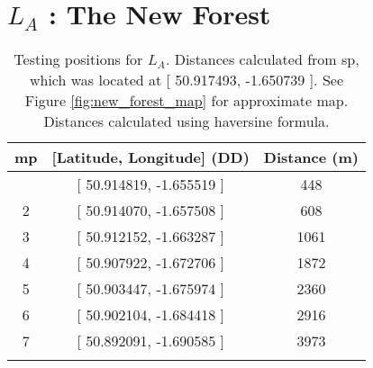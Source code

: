 \chapter{$L_A$ : The New Forest}\label{sec:new_forest_test_pos}

\begin{table}[H]
\centering
\caption[Testing positions for $L_A$]{Testing positions for $L_A$. Distances calculated from \ac{sp}, which was located at [ 50.917493, -1.650739 ]. See Figure \ref{fig:new_forest_map} for approximate map. Distances calculated using haversine formula. }
\begin{tabular}{ccc}
    \toprule
\textbf{\ac{mp}} & \textbf{[Latitude, Longitude]} (DD) & \textbf{Distance} (m)\\
    \midrule\addlinespace
1 & [ 50.914819, -1.655519 ] & 448 \\
2 & [ 50.914070, -1.657508 ] & 608 \\
3 & [ 50.912152, -1.663287 ] & 1061 \\
4 & [ 50.907922, -1.672706 ] & 1872 \\
5 & [ 50.903447, -1.675974 ] & 2360 \\
6 & [ 50.902104, -1.684418 ] & 2916 \\
7 & [ 50.892091, -1.690585 ] & 3973 \\
    \addlinespace\bottomrule
\end{tabular}
\end{table}
